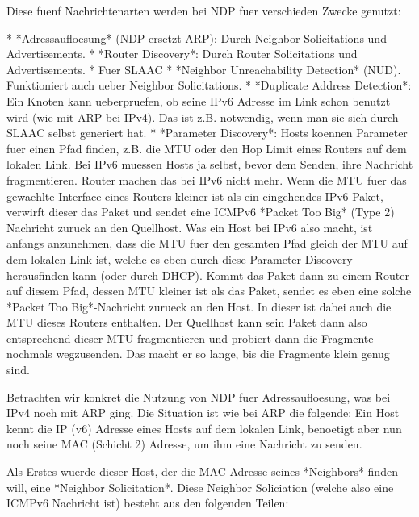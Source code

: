 Diese fuenf Nachrichtenarten werden bei NDP fuer verschieden Zwecke genutzt:

* *Adressaufloesung* (NDP ersetzt ARP): Durch Neighbor Solicitations und
  Advertisements.
* *Router Discovery*: Durch Router Solicitations und
  Advertisements.
* Fuer SLAAC
* *Neighbor Unreachability Detection* (NUD). Funktioniert auch ueber Neighbor
  Solicitations.
* *Duplicate Address Detection*: Ein Knoten kann ueberpruefen, ob seine IPv6
  Adresse im Link schon benutzt wird (wie mit ARP bei IPv4). Das ist
  z.B. notwendig, wenn man sie sich durch SLAAC selbst generiert hat.
* *Parameter Discovery*: Hosts koennen Parameter fuer einen Pfad finden,
  z.B. die MTU oder den Hop Limit eines Routers auf dem lokalen Link. Bei IPv6
  muessen Hosts ja selbst, bevor dem Senden, ihre Nachricht
  fragmentieren. Router machen das bei IPv6 nicht mehr. Wenn die MTU fuer das
  gewaehlte Interface eines Routers kleiner ist als ein eingehendes IPv6 Paket,
  verwirft dieser das Paket und sendet eine ICMPv6 *Packet Too Big* (Type 2)
  Nachricht zuruck an den Quellhost. Was ein Host bei IPv6 also macht, ist
  anfangs anzunehmen, dass die MTU fuer den gesamten Pfad gleich der MTU auf dem
  lokalen Link ist, welche es eben durch diese Parameter Discovery herausfinden
  kann (oder durch DHCP). Kommt das Paket dann zu einem Router auf diesem Pfad,
  dessen MTU kleiner ist als das Paket, sendet es eben eine solche *Packet Too
  Big*-Nachricht zurueck an den Host. In dieser ist dabei auch die MTU dieses
  Routers enthalten. Der Quellhost kann sein Paket dann also entsprechend dieser
  MTU fragmentieren und probiert dann die Fragmente nochmals wegzusenden. Das
  macht er so lange, bis die Fragmente klein genug sind.

Betrachten wir konkret die Nutzung von NDP fuer Adressaufloesung, was bei IPv4
noch mit ARP ging. Die Situation ist wie bei ARP die folgende: Ein Host kennt
die IP (v6) Adresse eines Hosts auf dem lokalen Link, benoetigt aber nun noch
seine MAC (Schicht 2) Adresse, um ihm eine Nachricht zu senden.

Als Erstes wuerde dieser Host, der die MAC Adresse seines *Neighbors* finden
will, eine *Neighbor Solicitation*. Diese Neighbor Soliciation (welche also eine
ICMPv6 Nachricht ist) besteht aus den folgenden Teilen:

